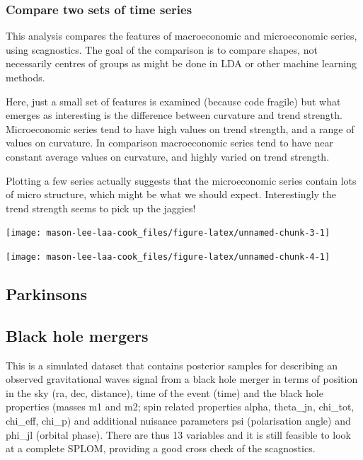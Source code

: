 \hypertarget{compare-two-sets-of-time-series}{%
\subsubsection{Compare two sets of time
series}\label{compare-two-sets-of-time-series}}

This analysis compares the features of macroeconomic and microeconomic
series, using scagnostics. The goal of the comparison is to compare
shapes, not necessarily centres of groups as might be done in LDA or
other machine learning methods.

Here, just a small set of features is examined (because code fragile)
but what emerges as interesting is the difference between curvature and
trend strength. Microeconomic series tend to have high values on trend
strength, and a range of values on curvature. In comparison
macroeconomic series tend to have near constant average values on
curvature, and highly varied on trend strength.

Plotting a few series actually suggests that the microeconomic series
contain lots of micro structure, which might be what we should expect.
Interestingly the trend strength seems to pick up the jaggies!

\begin{Schunk}

\texttt{[image: mason-lee-laa-cook\_files/figure-latex/unnamed-chunk-3-1]} \end{Schunk}

\begin{Schunk}

\texttt{[image: mason-lee-laa-cook\_files/figure-latex/unnamed-chunk-4-1]} \end{Schunk}

\hypertarget{parkinsons}{%
\subsection{Parkinsons}\label{parkinsons}}

\hypertarget{black-hole-mergers}{%
\subsection{Black hole mergers}\label{black-hole-mergers}}

This is a simulated dataset that contains posterior samples for
describing an observed gravitational waves signal from a black hole
merger in terms of position in the sky (ra, dec, distance), time of the
event (time) and the black hole properties (masses m1 and m2; spin
related properties alpha, theta\_jn, chi\_tot, chi\_eff, chi\_p) and
additional nuisance parameters psi (polarisation angle) and phi\_jl
(orbital phase). There are thus 13 variables and it is still feasible to
look at a complete SPLOM, providing a good cross check of the
scagnostics.

